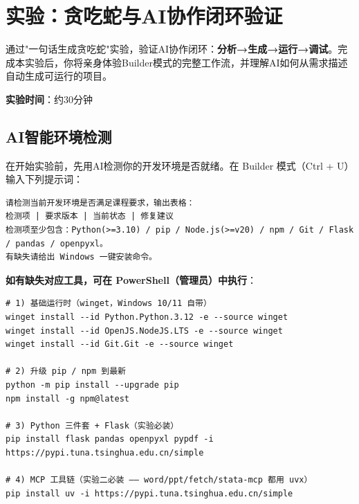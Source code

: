 \section{实验：贪吃蛇与AI协作闭环验证}

\begin{exercisebox}[实验目标]
通过"一句话生成贪吃蛇"实验，验证AI协作闭环：\textbf{分析→生成→运行→调试}。完成本实验后，你将亲身体验Builder模式的完整工作流，并理解AI如何从需求描述自动生成可运行的项目。
\end{exercisebox}

\textbf{实验时间}：约30分钟

\subsection{AI智能环境检测}

在开始实验前，先用AI检测你的开发环境是否就绪。在 Builder 模式（Ctrl + U）输入下列提示词：

\begin{lstlisting}
请检测当前开发环境是否满足课程要求，输出表格：
检测项 | 要求版本 | 当前状态 | 修复建议
检测项至少包含：Python(>=3.10) / pip / Node.js(>=v20) / npm / Git / Flask / pandas / openpyxl。
有缺失请给出 Windows 一键安装命令。
\end{lstlisting}

\textbf{如有缺失对应工具，可在 PowerShell（管理员）中执行}：

\begin{lstlisting}[style=shell]
# 1) 基础运行时（winget，Windows 10/11 自带）
winget install --id Python.Python.3.12 -e --source winget
winget install --id OpenJS.NodeJS.LTS -e --source winget
winget install --id Git.Git -e --source winget

# 2) 升级 pip / npm 到最新
python -m pip install --upgrade pip
npm install -g npm@latest

# 3) Python 三件套 + Flask（实验必装）
pip install flask pandas openpyxl pypdf -i https://pypi.tuna.tsinghua.edu.cn/simple

# 4) MCP 工具链（实验二必装 —— word/ppt/fetch/stata-mcp 都用 uvx）
pip install uv -i https://pypi.tuna.tsinghua.edu.cn/simple
\end{lstlisting}

